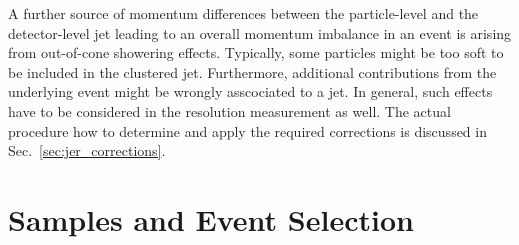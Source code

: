 A further source of momentum differences between the particle-level and the detector-level jet leading to an overall momentum imbalance in an event is arising from out-of-cone showering effects. Typically, some particles might be too soft to be included in the clustered jet. Furthermore, additional contributions from the underlying event might be wrongly asscociated to a jet. In general, such effects have to be considered in the resolution measurement as well. The actual procedure how to determine and apply the required corrections is discussed in Sec.~\ref{sec:jer_corrections}.

\section{Samples and Event Selection}
\label{sec:jer_selection}

